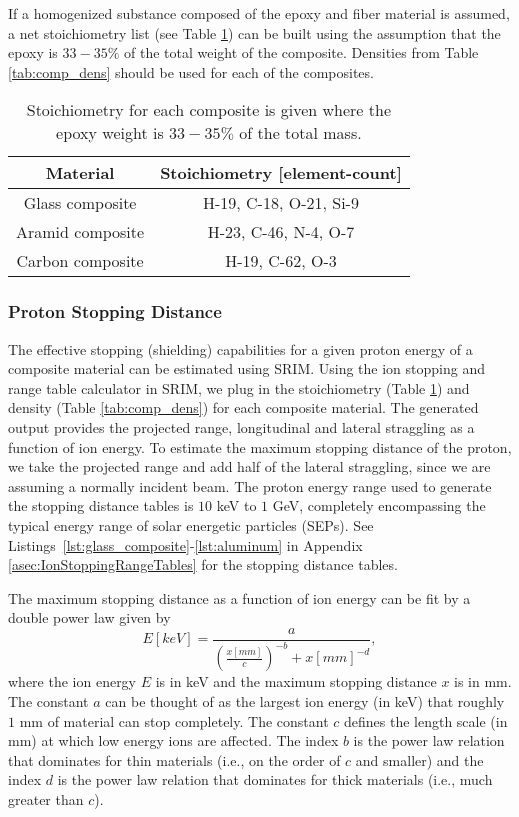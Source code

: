 \documentclass{hitec}
\begin{document}
If a homogenized substance composed of the epoxy and fiber material is assumed, a net stoichiometry list (see Table \ref{tab:stoichiometry-net}) can be built using the assumption that the epoxy is $33-35\%$ of the total weight of the composite. Densities from Table \ref{tab:comp_dens} should be used for each of the composites.

\begin{table}[h]\centering
	\caption{Stoichiometry for each composite is given where the epoxy weight is $33-35\%$ of the total mass.}\label{tab:stoichiometry-net}
	\begin{tabular}{|c | c |}\hline
		Material & Stoichiometry [element-count] \\\hline
		Glass composite & H-19, C-18, O-21, Si-9 \\\hline
		Aramid composite & H-23, C-46, N-4, O-7  \\\hline
		Carbon composite & H-19, C-62, O-3  \\\hline	
	\end{tabular}
\end{table}

\subsubsection{Proton Stopping Distance}

The effective stopping (shielding) capabilities for a given proton energy of a composite material can be estimated using SRIM. Using the ion stopping and range table calculator in SRIM, we plug in the stoichiometry (Table \ref{tab:stoichiometry-net}) and density (Table \ref{tab:comp_dens}) for each composite material. The generated output provides the projected range, longitudinal and lateral straggling as a function of ion energy. To estimate the maximum stopping distance of the proton, we take the projected range and add half of the lateral straggling, since we are assuming a normally incident beam. The proton energy range used to generate the stopping distance tables is $10$ keV to $1$ GeV, completely encompassing the typical energy range of solar energetic particles (SEPs). See Listings~\ref{lst:glass_composite}-\ref{lst:aluminum} in Appendix \ref{asec:IonStoppingRangeTables} for the stopping distance tables.

The maximum stopping distance as a function of ion energy can be fit by a double power law given by
\begin{equation}\label{eq:energy_vs_stopping_distance}
E[keV] = \frac{a}{\left(\frac{x[mm]}{c}\right)^{-b} + x[mm]^{-d}},
\end{equation}
where the ion energy $E$ is in keV and the maximum stopping distance $x$ is in mm. The constant $a$ can be thought of as the largest ion energy (in keV) that roughly $1$ mm of material can stop completely. The constant $c$ defines the length scale (in mm) at which low energy ions are affected. The index $b$ is the power law relation that dominates for thin materials (i.e., on the order of $c$ and smaller) and the index $d$ is the power law relation that dominates for thick materials (i.e., much greater than $c$).
\end{document}
